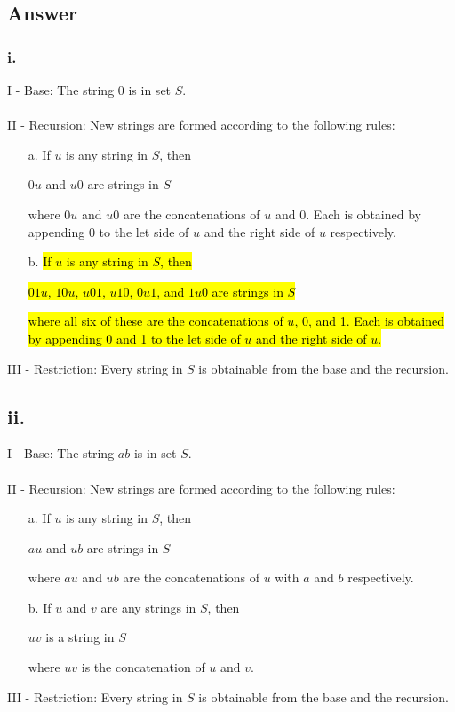 \documentclass[12pt]{article}
\begin{document}
\subsection*{Answer}
\subsubsection*{i.}
I - Base: The string 0 is in set $S$.
\\ \\
II - Recursion: New strings are formed according to the following rules:
\begin{itemize}
    \item [a.] If $u$ is any string in $S$, then
    \begin{center}
        $0u$ and $u0$ are strings in $S$\\
    \end{center}
    where $0u$ and $u0$ are the concatenations of $u$ and 0. Each is obtained by appending 0 to the let side of $u$ and the right side of $u$ respectively.
    \item [b.] \hl{If $u$ is any string in $S$, then}
    \begin{center}
        \hl{$01u$, $10u$, $u01$, $u10$, $0u1$, and $1u0$ are strings in $S$}\\
    \end{center}
    \hl{where all six of these are the concatenations of $u$, 0, and 1. Each is obtained by appending 0 and 1 to the let side of $u$ and the right side of $u$.}
\end{itemize}
III - Restriction: Every string in $S$ is obtainable from the base and the recursion.
\subsection*{ii.}
I - Base: The string $ab$ is in set $S$.
\\ \\
II - Recursion: New strings are formed according to the following rules:
\begin{itemize}
    \item [a.] If $u$ is any string in $S$, then 
    \begin{center}
        $au$ and $ub$ are strings in $S$\\
    \end{center}
    where $au$ and $ub$ are the concatenations of $u$ with $a$ and $b$ respectively.
    \item [b.] If $u$ and $v$ are any strings in $S$, then
    \begin{center}
        $uv$ is a string in $S$\\
    \end{center}
    where $uv$ is the concatenation of $u$ and $v$.
\end{itemize}
III - Restriction: Every string in $S$ is obtainable from the base and the recursion.
\end{document}
